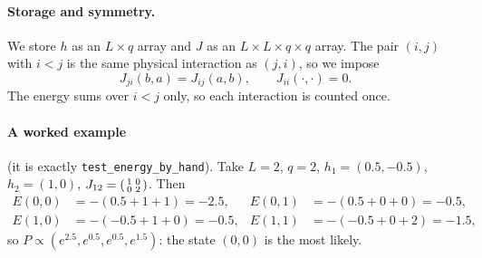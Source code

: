 \documentclass[11pt,a4paper]{article}
\begin{document}
\paragraph{Storage and symmetry.} We store $h$ as an $L\times q$ array and $J$ as an
$L\times L\times q\times q$ array. The pair $(i,j)$ with $i<j$ is the same physical interaction as
$(j,i)$, so we impose
\begin{equation}\label{eq:sym}
  J_{ji}(b,a) = J_{ij}(a,b), \qquad J_{ii}(\cdot,\cdot) = 0 .
\end{equation}
The energy sums over $i<j$ only, so each interaction is counted once.

\paragraph{A worked example} (it is exactly \texttt{test\_energy\_by\_hand}). Take $L=2$, $q=2$, $h_1=(0.5,-0.5)$,
$h_2=(1,0)$, $J_{12}=\begin{psmallmatrix}1&0\\0&2\end{psmallmatrix}$. Then
\begin{align*}
E(0,0) &= -(0.5+1+1) = -2.5, & E(0,1) &= -(0.5+0+0) = -0.5,\\
E(1,0) &= -(-0.5+1+0) = -0.5, & E(1,1) &= -(-0.5+0+2) = -1.5,
\end{align*}
so $P \propto (e^{2.5},e^{0.5},e^{0.5},e^{1.5})$: the state $(0,0)$ is the most likely.
\end{document}
